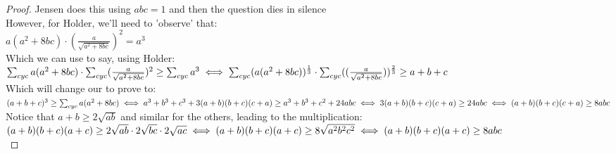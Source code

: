 \begin{proof}
    Jensen does this using $abc=1$ and then the question dies in silence\\
    However, for Holder, we'll need to 'observe' that:\\
    $a(a^2+8bc) \cdot (\frac{a}{\sqrt{a^2+8bc}})^2= a^3$\\
    Which we can use to say, using Holder:\\
    $\sum_{cyc} a(a^2+8bc) \cdot \sum_{cyc}(\frac{a}{\sqrt{a^2+8bc}})^2 \geq \sum_{cyc} a^3\\
    \iff \sum_{cyc} (a(a^2+8bc))^{\frac{1}{3}} \cdot \sum_{cyc}((\frac{a}{\sqrt{a^2+8bc}}))^{\frac{2}{3}} \geq a+b+c$\\
    Which will change our to prove to:\\
    $(a+b+c)^3 \geq \sum_{cyc} a(a^2+8bc)\\
    \iff a^3+b^3+c^3+3(a+b)(b+c)(c+a) \geq a^3+b^3+c^2+24abc\\
    \iff 3(a+b)(b+c)(c+a) \geq 24abc\\
    \iff (a+b)(b+c)(c+a) \geq 8abc$\\
    Notice that $a+b \geq 2\sqrt{ab}$ and similar for the others, leading to the multiplication:\\
    $(a+b)(b+c)(a+c) \geq 2\sqrt{ab} \cdot2\sqrt{bc} \cdot2\sqrt{ac}\\
    \iff (a+b)(b+c)(a+c) \geq 8\sqrt{a^2b^2c^2}\\
    \iff (a+b)(b+c)(a+c) \geq 8abc$\\
\end{proof}
